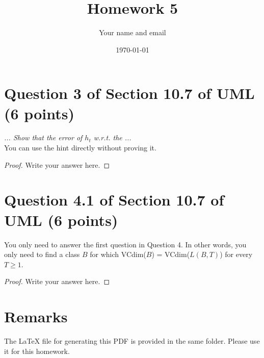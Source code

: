 \documentclass{article}
\title{Homework 5}
\author{Your name and email}
\date{\today}
\begin{document}
\maketitle

\section{Question 3 of Section 10.7 of UML (6 points)}
\emph{... Show that the error of $h_t$ w.r.t. the ...} \\
You can use the hint directly without proving it.
\begin{proof}
    Write your answer here.
\end{proof}
\section{Question 4.1 of Section 10.7 of UML (6 points)}
You only need to answer the first question in Question 4. 
In other words,
you only need to
find a class $B$ for which VCdim($B$) = VCdim($L(B, T )$) for every $T\geq 1$.
\begin{proof}
    Write your answer here.
\end{proof}

\section{Remarks}

The \LaTeX{} file for generating this PDF is provided in the same folder. 
Please use it for this homework.
\end{document}
